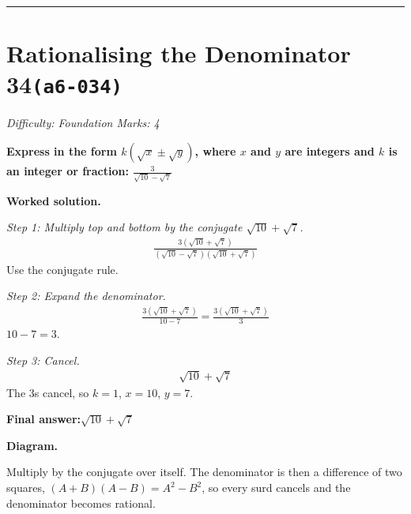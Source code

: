 \documentclass[11pt]{article}
\newcommand{\question}[1]{\par\medskip\noindent\textbf{#1}\par}
\begin{document}
\medskip\hrule

\section*{Rationalising the Denominator 34\quad\small\texttt{(a6-034)}}
\textit{Difficulty: Foundation \quad\textbar\quad Marks: 4}

\question{Express in the form \( k(\sqrt{x} \pm \sqrt{y}) \), where \( x \) and \( y \) are integers and \( k \) is an integer or fraction: \( \frac{3}{\sqrt{10} - \sqrt{7}} \)}

\textbf{Worked solution.}

\textit{Step 1: Multiply top and bottom by the conjugate \( \sqrt{10} + \sqrt{7} \).}
\[\begin{gathered}
\frac{3(\sqrt{10} + \sqrt{7})}{(\sqrt{10} - \sqrt{7})(\sqrt{10} + \sqrt{7})}
\end{gathered}\]
Use the conjugate rule.

\textit{Step 2: Expand the denominator.}
\[\begin{gathered}
\frac{3(\sqrt{10} + \sqrt{7})}{10 - 7} = \frac{3(\sqrt{10} + \sqrt{7})}{3}
\end{gathered}\]
\( 10 - 7 = 3 \).

\textit{Step 3: Cancel.}
\[\begin{gathered}
\sqrt{10} + \sqrt{7}
\end{gathered}\]
The 3s cancel, so \( k = 1 \), \( x = 10 \), \( y = 7 \).

\begin{answerbox}
\textbf{Final answer:}\quad \(\displaystyle \sqrt{10} + \sqrt{7}\)
\end{answerbox}
\textbf{Diagram.}

\begin{center}
\end{center}
\small Multiply by the conjugate over itself. The denominator is then a difference of two squares, $(A+B)(A-B)=A^{2}-B^{2}$, so every surd cancels and the denominator becomes rational.\normalsize
\end{document}
